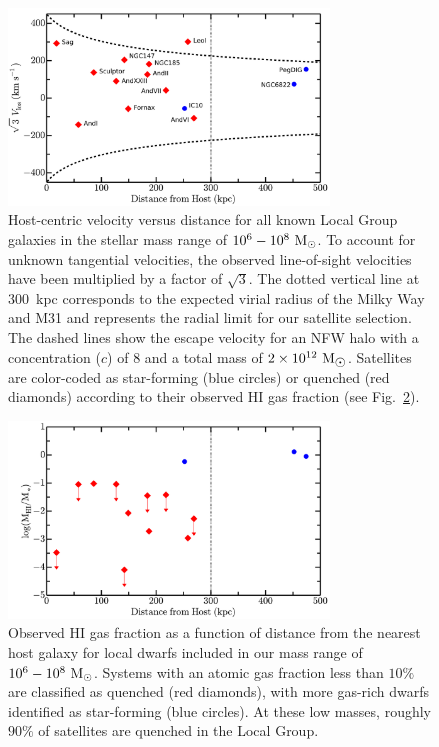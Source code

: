 \documentclass[usenatbib]{mn2e}
\newcommand{\msun}{{\rm M}_{\odot}}
\begin{document}
\begin{figure}
 \centering
 \hspace*{-0.05in}
 \includegraphics[width=3.35in]{f1.pdf}
 \caption{Host-centric velocity versus distance for all known Local
   Group galaxies in the stellar mass range of
   $10^{6}-10^{8}~\msun$. To account for unknown tangential
   velocities, the observed line-of-sight velocities have been multiplied by a
   factor of $\sqrt{3}$. The dotted vertical line at $300$~kpc
   corresponds to the expected virial radius of the Milky Way and M31
   and represents the radial limit for our satellite selection. The
   dashed lines show the escape velocity for an NFW halo with a
   concentration ($c$) of $8$ and a total mass of $2\times 10^{12}\
   \rm M_{\hbox{$\odot$}}$. Satellites are color-coded as star-forming (blue
   circles) or quenched (red diamonds) according to their observed
   H{\scriptsize I} gas fraction (see
   Fig.~\ref{fig:h1}). }
 \label{fig:vlos}
\end{figure}



\begin{figure}
 \centering
 \hspace*{-0.08in}
 \includegraphics[width=3.35in]{f2.pdf}
 \caption{Observed H{\scriptsize I} gas fraction as a function of
   distance from the nearest host galaxy for local dwarfs included in
   our mass range of $10^6-10^{8}~\msun$. Systems with an atomic gas
   fraction less than $10\%$ are classified as quenched (red
   diamonds), with more gas-rich dwarfs identified as star-forming
   (blue circles). At these low masses, roughly $90\%$ of satellites
   are quenched in the Local Group.}
 \label{fig:h1}
\end{figure}
\end{document}
